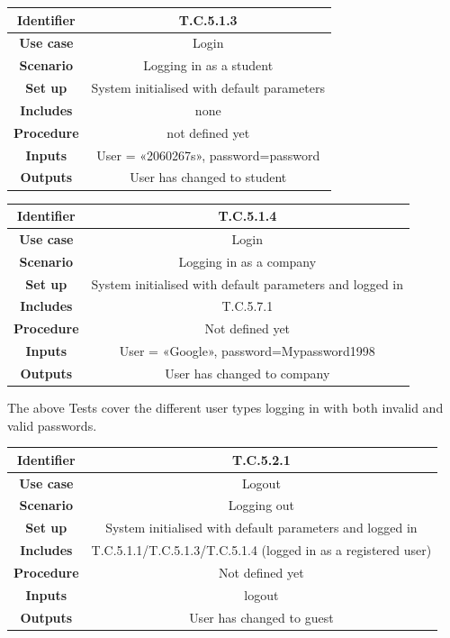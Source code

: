 \documentclass{l3deliverable}
\begin{document}
\begin{tabular}{|c|c|}
\hline \textbf{Identifier} & T.C.5.1.3\\
\hline \textbf{Use case} & Login \\
\hline \textbf{Scenario} & Logging in as a student\\
\hline \textbf{Set up} & System initialised with default parameters\\
\hline \textbf{Includes} & none\\
\hline \textbf{Procedure} & not defined yet\\
\hline \textbf{Inputs} & User = «2060267s», password=password\\
\hline \textbf{Outputs} & User has changed to student\\
\hline
\end{tabular}

\begin{tabular}{|c|c|}
\hline \textbf{Identifier} & T.C.5.1.4 \\
\hline \textbf{Use case} & Login \\
\hline \textbf{Scenario} & Logging in as a company\\
\hline \textbf{Set up} & System initialised with default parameters and logged in\\
\hline \textbf{Includes} & T.C.5.7.1\\
\hline \textbf{Procedure} & Not defined yet\\
\hline \textbf{Inputs} & User = «Google», password=Mypassword1998\\
\hline \textbf{Outputs} & User has changed to company\\
\hline
\end{tabular}

The above Tests cover the different user types logging in with both
invalid and valid passwords.\\ 

\begin{tabular}{|c|c|}
\hline \textbf{Identifier} & T.C.5.2.1 \\
\hline \textbf{Use case} & Logout \\
\hline \textbf{Scenario} & Logging out\\
\hline \textbf{Set up} & System initialised with default parameters and logged in\\
\hline \textbf{Includes} & T.C.5.1.1/T.C.5.1.3/T.C.5.1.4 (logged in as a registered user)\\
\hline \textbf{Procedure} & Not defined yet\\
\hline \textbf{Inputs} & logout\\
\hline \textbf{Outputs} & User has changed to guest\\
\hline
\end{tabular}
\end{document}
